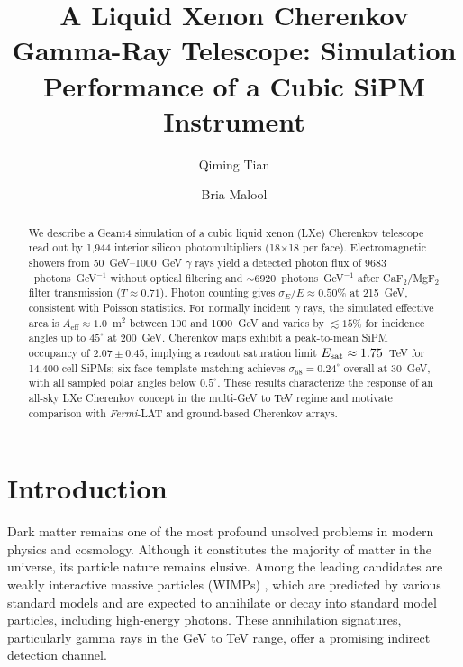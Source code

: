 \documentclass{aastex701}
\begin{document}
\title{A Liquid Xenon Cherenkov Gamma-Ray Telescope: Simulation Performance of a Cubic SiPM Instrument}

\author[0009-0001-8337-6163]{Qiming Tian}

\author{Bria Malool}

\journalinfo{}

\begin{abstract}
We describe a Geant4 simulation of a cubic liquid xenon (LXe) Cherenkov telescope read out by 1{,}944 interior silicon photomultipliers (18$\times$18 per face). Electromagnetic showers from \qtyrange{50}{1000}{\GeV} $\gamma$ rays yield a detected photon flux of $9683$~photons~GeV$^{-1}$ without optical filtering and $\sim 6920$~photons~GeV$^{-1}$ after CaF$_2$/MgF$_2$ filter transmission ($\bar{T}\approx 0.71$). Photon counting gives $\sigma_E/E \approx 0.50\%$ at 215~GeV, consistent with Poisson statistics. For normally incident $\gamma$ rays, the simulated effective area is $A_\mathrm{eff} \approx 1.0$~m$^2$ between 100 and 1000~GeV and varies by $\lesssim 15\%$ for incidence angles up to $45^\circ$ at 200~GeV. Cherenkov maps exhibit a peak-to-mean SiPM occupancy of $2.07\pm 0.45$, implying a readout saturation limit $E_{\rm sat}\approx 1.75$~TeV for 14{,}400-cell SiPMs; six-face template matching achieves $\sigma_{68}=0.24^\circ$ overall at 30~GeV, with all sampled polar angles below $0.5^\circ$. These results characterize the response of an all-sky LXe Cherenkov concept in the multi-GeV to TeV regime and motivate comparison with \textit{Fermi}-LAT and ground-based Cherenkov arrays.
\end{abstract}


\section{Introduction}

Dark matter remains one of the most profound unsolved problems in modern physics and cosmology. Although it constitutes the majority of matter in the universe, its particle nature remains elusive. Among the leading candidates are weakly interactive massive particles (WIMPs) \cite{Bertone2005}, which are predicted by various standard models and are expected to annihilate or decay into standard model particles, including high-energy photons. These annihilation signatures, particularly gamma rays in the GeV to TeV range, offer a promising indirect detection channel.  
\end{document}
